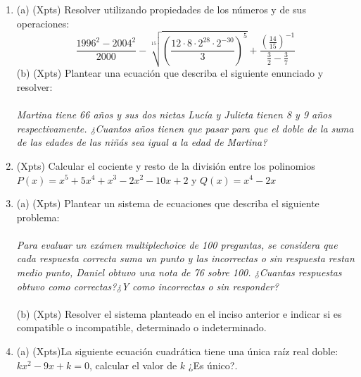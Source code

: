 \documentclass[a4paper]{article}
\begin{document}
\begin{enumerate}
        \item (a) (Xpts) Resolver utilizando propiedades de los números y de sus operaciones:
        \begin{equation*}
                \frac{1996^2-2004^2}{2000}-\sqrt[15]{\left(\frac{12\cdot 8\cdot 2^{28} \cdot 2^{-30}}{3}\right)^5} + \frac{\left(\frac{14}{15}\right)^{-1}}{\frac{3}{2}-\frac{3}{7}}
        \end{equation*}
        (b) (Xpts) Plantear una ecuación que describa el siguiente enunciado y resolver:\\\\
         \textit{Martina tiene 66 años y sus dos nietas Lucía y Julieta tienen 8 y 9 años respectivamente. ¿Cuantos años tienen que pasar para que el doble de la suma de las edades de las niñás sea igual a la edad de Martina?}
        \item (Xpts) Calcular el cociente y resto de la división entre los polinomios $P(x)=x^5+5x^4+x^3-2x^2-10x+2$ y $Q(x)=x^4-2x$
        \item (a) (Xpts) Plantear un sistema de ecuaciones que describa el siguiente problema:\\\\
        \textit{Para evaluar un exámen multiplechoice de 100 preguntas, se considera que cada respuesta correcta suma un punto y las incorrectas o sin respuesta restan medio punto, Daniel obtuvo una nota de 76 sobre 100. ¿Cuantas respuestas obtuvo como correctas?¿Y como incorrectas o sin responder?}\\\\
        (b) (Xpts) Resolver el sistema planteado en el inciso anterior e indicar si es compatible o incompatible, determinado o indeterminado.
        \item (a) (Xpts)La siguiente ecuación cuadrática tiene una única raíz real doble: $k x^2 - 9x + k = 0$, calcular el valor de $k$ ¿Es único?.\\\\

\end{enumerate}
\end{document}
